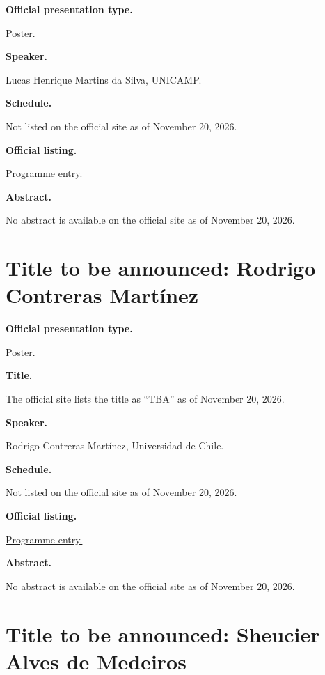 \medskip\noindent
{\bf Official presentation type.}

Poster.

\medskip\noindent
{\bf Speaker.}

Lucas Henrique Martins da Silva, UNICAMP.

\medskip\noindent
{\bf Schedule.}

Not listed on the official site as of
November 20, 2026.

\medskip\noindent
{\bf Official listing.}

\href{%
https://sites.google.com/view/%
geoalgcompluff/legal/%
legal-2027-resumos#h.f3btoqn8ykd7%
}{Programme entry.}

\medskip\noindent
{\bf Abstract.}

No abstract is available on the
official site as of November 20, 2026.

\section{Title to be announced: Rodrigo
Contreras Martínez}
\label{section-tba-poster-martinez}

\medskip\noindent
{\bf Official presentation type.}

Poster.

\medskip\noindent
{\bf Title.}

The official site lists the title as
``TBA'' as of November 20, 2026.

\medskip\noindent
{\bf Speaker.}

Rodrigo Contreras Martínez, Universidad de
Chile.

\medskip\noindent
{\bf Schedule.}

Not listed on the official site as of
November 20, 2026.

\medskip\noindent
{\bf Official listing.}

\href{%
https://sites.google.com/view/%
geoalgcompluff/legal/%
legal-2027-resumos#h.f3btoqn8ykd7%
}{Programme entry.}

\medskip\noindent
{\bf Abstract.}

No abstract is available on the
official site as of November 20, 2026.

\section{Title to be announced: Sheucier
Alves de Medeiros}
\label{section-tba-poster-medeiros}

